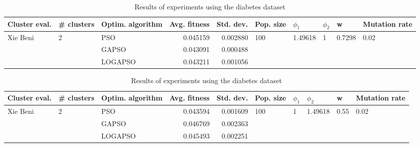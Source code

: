 \documentclass{article}
\begin{document}
\begin{table}
\centering
\caption{Results of experiments using the diabetes dataset}
\begin{tabular}{lllrrlllll}
\toprule
            Cluster eval. &        \# clusters & Optim. algorithm &  Avg. fitness &  Std. dev. &            Pop. size &               $\phi_{1}$ &         $\phi_{2}$ &                       w &         Mutation rate \\
\midrule
\multirow{3}{*}{Xie Beni} & \multirow{3}{*}{2} &              PSO &      0.045159 &   0.002880 & \multirow{3}{*}{100} & \multirow{3}{*}{1.49618} & \multirow{3}{*}{1} & \multirow{3}{*}{0.7298} & \multirow{3}{*}{0.02} \\
                          &                    &            GAPSO &      0.043091 &   0.000488 &                      &                          &                    &                         &                       \\
                          &                    &          LOGAPSO &      0.043211 &   0.001056 &                      &                          &                    &                         &                       \\
\bottomrule
\end{tabular}
\end{table}
\begin{table}
\centering
\caption{Results of experiments using the diabetes dataset}
\begin{tabular}{lllrrlllll}
\toprule
            Cluster eval. &        \# clusters & Optim. algorithm &  Avg. fitness &  Std. dev. &            Pop. size &         $\phi_{1}$ &               $\phi_{2}$ &                     w &         Mutation rate \\
\midrule
\multirow{3}{*}{Xie Beni} & \multirow{3}{*}{2} &              PSO &      0.043594 &   0.001609 & \multirow{3}{*}{100} & \multirow{3}{*}{1} & \multirow{3}{*}{1.49618} & \multirow{3}{*}{0.55} & \multirow{3}{*}{0.02} \\
                          &                    &            GAPSO &      0.046769 &   0.002363 &                      &                    &                          &                       &                       \\
                          &                    &          LOGAPSO &      0.045493 &   0.002251 &                      &                    &                          &                       &                       \\
\bottomrule
\end{tabular}
\end{table}
\end{document}
